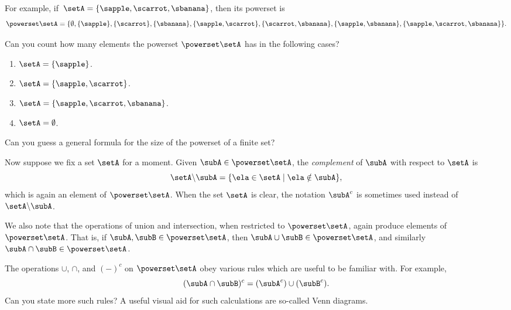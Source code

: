 For example, if~$\setA = \{ \sapple, \scarrot, \sbanana \}$, then its powerset is
\begin{equation*}
    \powerset \setA = \{ \emptyset, \{ \sapple \}, \{ \scarrot \}, \{ \sbanana\}, \{ \sapple, \scarrot \}, \{ \scarrot, \sbanana \}, \{ \sapple, \sbanana\}, \{ \sapple, \scarrot, \sbanana \} \}.
\end{equation*}

\begin{exercise}
Can you count how many elements the powerset $\powerset \setA$ has in the following cases? 
\begin{enumerate}
\item $\setA = \{ \sapple \} $. 
\item $\setA = \{ \sapple, \scarrot \} $.
\item $\setA = \{ \sapple, \scarrot, \sbanana \} $. 
\item $\setA = \emptyset $. 
\end{enumerate}
Can you guess a general formula for the size of the powerset of a finite set? 
\end{exercise}

\begin{solution}
\end{solution}

Now suppose we fix a set $\setA$ for a moment. Given $\subA \in \powerset \setA$, the \emph{complement} of $\subA$ with respect to $\setA$ is
\begin{equation}
\setA \backslash \subA = \{ \ela \in \setA \mid \ela \notin \subA \},
\end{equation}
which is again an element of $\powerset \setA$. 
When the set $\setA$ is clear, the notation $\subA^c$ is sometimes used instead of $\setA \backslash \subA$. 

We also note that the operations of union and intersection, when restricted to $\powerset \setA$, again produce elements of $\powerset \setA$. That is, if $\subA, \subB \in \powerset \setA$, then $\subA \cup \subB \in \powerset \setA$, and similarly $\subA \cap \subB \in \powerset \setA$. 

The operations $\cup$, $\cap$, and $( - )^c$ on $\powerset \setA$ obey various rules which are useful to be familiar with. For example, 
\begin{equation}
(\subA \cap \subB)^c = (\subA^c) \cup (\subB^c).
\end{equation}
Can you state more such rules? 
A useful visual aid for such calculations are so-called Venn diagrams. 

